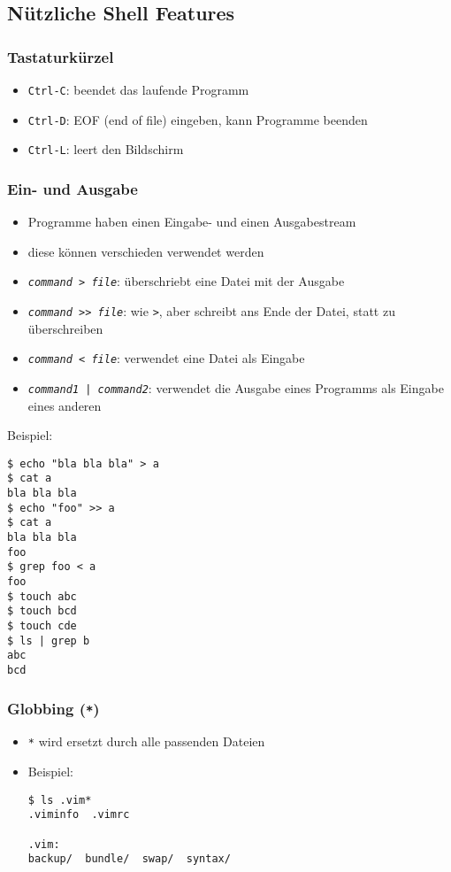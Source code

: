 \documentclass{article}
\begin{document}
    \subsection{Nützliche Shell Features}
      \subsubsection{Tastaturkürzel}
        \begin{itemize}
          \item \texttt{Ctrl-C}: beendet das laufende Programm
          \item \texttt{Ctrl-D}: EOF (end of file) eingeben, kann Programme beenden
          \item \texttt{Ctrl-L}: leert den Bildschirm
        \end{itemize}

      \subsubsection{Ein- und Ausgabe}
        \begin{itemize}
          \item Programme haben einen Eingabe- und einen Ausgabestream
          \item diese können verschieden verwendet werden
          \item \texttt{\textit{command} > \textit{file}}: überschriebt eine Datei mit der Ausgabe
          \item \texttt{\textit{command} >> \textit{file}}: wie \texttt{>}, aber schreibt ans Ende der Datei, statt zu überschreiben
          \item \texttt{\textit{command} < \textit{file}}: verwendet eine Datei als Eingabe
          \item \texttt{\textit{command1} | \textit{command2}}: verwendet die Ausgabe eines Programms als Eingabe eines anderen
        \end{itemize}
        Beispiel:
\begin{verbatim}
$ echo "bla bla bla" > a
$ cat a
bla bla bla
$ echo "foo" >> a
$ cat a
bla bla bla
foo
$ grep foo < a
foo
$ touch abc
$ touch bcd
$ touch cde
$ ls | grep b
abc
bcd
\end{verbatim}

      \subsubsection{Globbing (\texttt{*})}
        \begin{itemize}
          \item \texttt{*} wird ersetzt durch alle passenden Dateien
          \item Beispiel:
\begin{verbatim}
$ ls .vim*
.viminfo  .vimrc

.vim:
backup/  bundle/  swap/  syntax/
\end{verbatim}
        \end{itemize}
\end{document}
